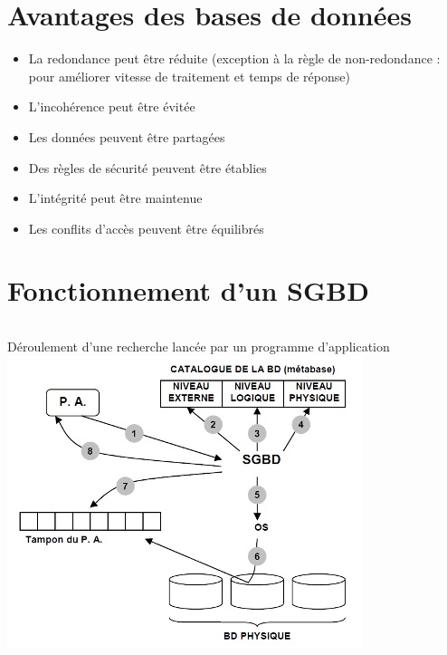\documentclass[10pt]{beamer}
\begin{document}
\section{Avantages des bases de données}
\begin{frame}{\secname }
    \begin{itemize}
        \item La redondance peut être réduite (exception à la règle de non-redondance : pour améliorer vitesse de traitement et temps de réponse)
        \item L’incohérence peut être évitée
        \item Les données peuvent être partagées
        \item Des règles de sécurité peuvent être établies
        \item L’intégrité peut être maintenue
        \item Les conflits d’accès peuvent être équilibrés
    \end{itemize}
\end{frame}
\section{Fonctionnement d’un SGBD}
\begin{frame}{\secname }
    \begin{columns}
        Déroulement d’une recherche lancée par un programme d’application
        \includegraphics[width=0.8\linewidth]{../assets/img/architecture_sgbd--7.jpg}
    \end{columns}
\end{frame}
\end{document}
